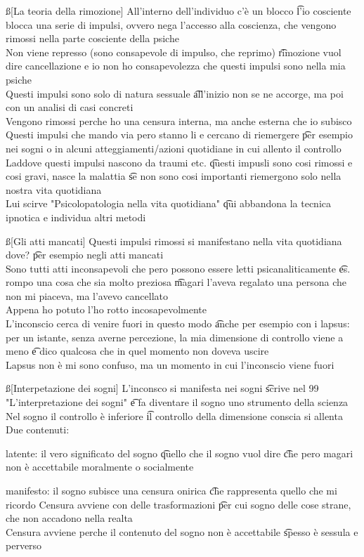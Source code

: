 \documentclass[12pt]{article}
\begin{document}
\ss[La teoria della rimozione]
All'interno dell'individuo c'è un blocco \t l'io cosciente blocca una serie di impulsi, ovvero nega l'accesso alla coscienza, che vengono rimossi nella parte cosciente della psiche \\
Non viene represso (sono consapevole di impulso, che reprimo) \t rimozione vuol dire cancellazione e io non ho consapevolezza che questi impulsi sono nella mia psiche \\
Questi impulsi sono solo di natura sessuale \t all'inizio non se ne accorge, ma poi con un analisi di casi concreti \\
Vengono rimossi perche ho una censura interna, ma anche esterna che io subisco \\
Questi impulsi che mando via pero stanno li e cercano di riemergere \t per esempio nei sogni o in alcuni atteggiamenti/azioni quotidiane in cui allento il controllo \\
Laddove questi impulsi nascono da traumi etc. \t questi impusli sono cosi rimossi e cosi gravi, nasce la malattia \t se non sono cosi importanti riemergono solo nella nostra vita quotidiana \\
Lui scirve "Psicolopatologia nella vita quotidiana" \t qui abbandona la tecnica ipnotica e individua altri metodi

\ss[Gli atti mancati]
Questi impulsi rimossi si manifestano nella vita quotidiana dove? \t per esempio negli atti mancati \\
Sono tutti atti inconsapevoli che pero possono essere letti psicanaliticamente \t es. rompo una cosa che sia molto preziosa \t magari l'aveva regalato una persona che non mi piaceva, ma l'avevo cancellato \\
Appena ho potuto l'ho rotto incosapevolmente \\
L'inconscio cerca di venire fuori in questo modo \t anche per esempio con i lapsus: per un istante, senza averne percezione, la mia dimensione di controllo viene a meno \t e dico qualcosa che in quel momento non doveva uscire \\
Lapsus non è mi sono confuso, ma un momento in cui l'inconscio viene fuori

\ss[Interpetazione dei sogni]
L'inconsco si manifesta nei sogni \t scrive nel 99 "L'interpretazione dei sogni" \t e fa diventare il sogno uno strumento della scienza \\
Nel sogno il controllo è inferiore \t il controllo della dimensione conscia si allenta \\
Due contenuti:
\bi
    \item latente: il vero significato del sogno \t quello che il sogno vuol dire \t che pero magari non è accettabile moralmente o socialmente
    \item manifesto: il sogno subisce una censura onirica \t che rappresenta quello che mi ricordo
\ei
Censura avviene con delle trasformazioni \t per cui sogno delle cose strane, che non accadono nella realta \\
Censura avviene perche il contenuto del sogno non è accettabile \t spesso è sessula e perverso
\end{document}
